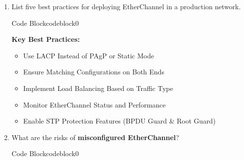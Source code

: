 \documentclass[a4paper]{article}
\begin{document}
\begin{enumerate}
	\item List five best practices for deploying EtherChannel in a production network.


	      \begin{ocg}{Code Block}{codeblock}{0}

		      \vspace{0.5cm}

		      \textbf{Key Best Practices:}
		      \begin{tcolorbox}
			      \begin{itemize}
				      \item Use LACP Instead of PAgP or Static Mode
				      \item Ensure Matching Configurations on Both Ends
				      \item Implement Load Balancing Based on Traffic Type
				      \item Monitor EtherChannel Status and Performance
				      \item Enable STP Protection Features (BPDU Guard \& Root Guard)
			      \end{itemize}
		      \end{tcolorbox}

		      \vspace{0.5cm}
	      \end{ocg}


	\item What are the risks of \textbf{misconfigured EtherChannel}?



	      \begin{ocg}{Code Block}{codeblock}{0}

		      \medskip


\end{ocg}
\end{enumerate}
\end{document}
